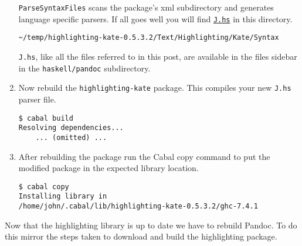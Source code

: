 \documentclass[]{article}
\begin{document}
\begin{enumerate}[1.]
  \texttt{ParseSyntaxFiles} scans the package's xml subdirectory and
  generates language specific parsers. If all goes well you will find
  \href{https://www.box.com/s/20x4mes7neyj05lppued}{\texttt{J.hs}} in
  this directory.

\begin{verbatim}
~/temp/highlighting-kate-0.5.3.2/Text/Highlighting/Kate/Syntax
\end{verbatim}

  \texttt{J.hs}, like all the files referred to in this post, are
  available in the files sidebar in the \texttt{haskell/pandoc}
  subdirectory.
\item
  Now rebuild the \texttt{highlighting-kate} package. This compiles your
  new \texttt{J.hs} parser file.

\begin{verbatim}
$ cabal build
Resolving dependencies...
    ... (omitted) ...
\end{verbatim}
\item
  After rebuilding the package run the Cabal copy command to put the
  modified package in the expected library location.

\begin{verbatim}
$ cabal copy
Installing library in
/home/john/.cabal/lib/highlighting-kate-0.5.3.2/ghc-7.4.1
\end{verbatim}
\end{enumerate}

Now that the highlighting library is up to date we have to rebuild
Pandoc. To do this mirror the steps taken to download and build the
highlighting package.
\end{document}
